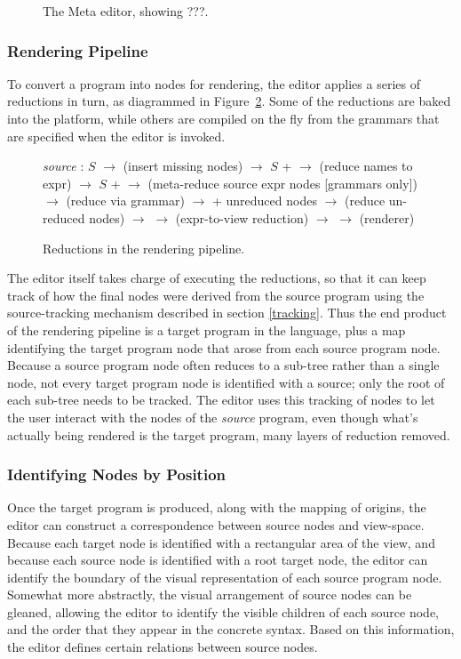\begin{figure}[ht]
\caption{\label{fig-editor} The Meta editor, showing ???.}
\end{figure}


\subsubsection{Rendering Pipeline}
To convert a program into  nodes for rendering, the editor applies a series of reductions in turn, as diagrammed in Figure\ \ref{fig-pipeline}. Some of the reductions are baked into the platform, while others are compiled on the fly from the grammars that are specified when the editor is invoked. 

\begin{figure}[ht]

\emph{source} : $S$ $\to$ (insert missing nodes) $\to$ $S$ +  $\to$ (reduce names to expr) $\to$ $S$ +  $\to$ (meta-reduce source expr nodes [grammars only]) $\to$ (reduce via grammar) $\to$  + unreduced nodes $\to$ (reduce un-reduced nodes) $\to$  $\to$ (expr-to-view reduction) $\to$  $\to$ (renderer)

\caption{\label{fig-pipeline} Reductions in the rendering pipeline.}
\end{figure}

The editor itself takes charge of executing the reductions, so that it can keep track of how the final  nodes were derived from the source program using the source-tracking mechanism described in section \ref{tracking}. Thus the end product of the rendering pipeline is a target program in the  language, plus a map identifying the target program node that arose from each source program node. Because a source program node often reduces to a sub-tree rather than a single node, not every target program node is identified with a source; only the root of each sub-tree needs to be tracked. The editor uses this tracking of nodes to let the user interact with the nodes of the \emph{source} program, even though what's actually being rendered is the target program, many layers of reduction removed.


\subsubsection{Identifying Nodes by Position}
Once the target program is produced, along with the mapping of origins, the editor can construct a correspondence between source nodes and view-space. Because each target node is identified with a rectangular area of the view, and because each source node is identified with a root target node, the editor can identify the boundary of the visual representation of each source program node. Somewhat more abstractly, the visual arrangement of source nodes can be gleaned, allowing the editor to identify the visible children of each source node, and the order that they appear in the concrete syntax. Based on this information, the editor defines certain relations between source nodes.

